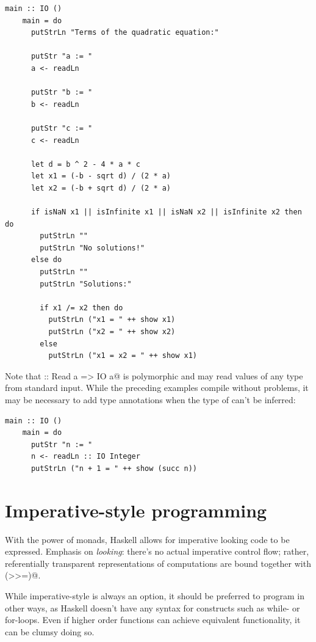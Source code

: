\documentclass[UdineBachThesis,american,11pt]{PhdThesis}
\begin{document}
  \begin{lstlisting}[gobble=4,basicstyle=\ttfamily\small]
    main :: IO ()
    main = do
      putStrLn "Terms of the quadratic equation:"

      putStr "a := "
      a <- readLn

      putStr "b := "
      b <- readLn

      putStr "c := "
      c <- readLn

      let d = b ^ 2 - 4 * a * c
      let x1 = (-b - sqrt d) / (2 * a)
      let x2 = (-b + sqrt d) / (2 * a)

      if isNaN x1 || isInfinite x1 || isNaN x2 || isInfinite x2 then do
        putStrLn ""
        putStrLn "No solutions!"
      else do
        putStrLn ""
        putStrLn "Solutions:"

        if x1 /= x2 then do
          putStrLn ("x1 = " ++ show x1)
          putStrLn ("x2 = " ++ show x2)
        else
          putStrLn ("x1 = x2 = " ++ show x1)
  \end{lstlisting}

  Note that \lstinline@readLn :: Read a => IO a@ is polymorphic and may read
  values of any type from standard input. While the preceding examples compile
  without problems, it may be necessary to add type annotations when the type of
  \lstinline@readLn@ can't be inferred:

  \begin{lstlisting}[gobble=4,basicstyle=\ttfamily\small]
    main :: IO ()
    main = do
      putStr "n := "
      n <- readLn :: IO Integer
      putStrLn ("n + 1 = " ++ show (succ n))
  \end{lstlisting}

  \section{Imperative-style programming}

  With the power of monads, Haskell allows for imperative looking code to be
  expressed. Emphasis on \emph{looking}: there's no actual imperative control
  flow; rather, referentially transparent representations of computations are
  bound together with \lstinline@(>>=)@.

  While imperative-style is always an option, it should be preferred to program
  in other ways, as Haskell doesn't have any syntax for constructs such as
  while- or for-loops. Even if higher order functions can achieve equivalent
  functionality, it can be clumsy doing so.
\end{document}
